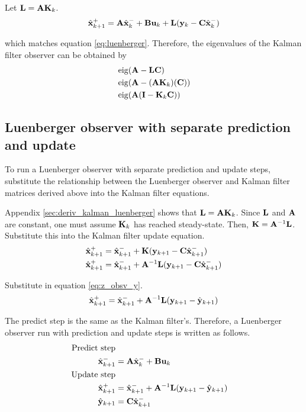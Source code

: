 Let $\mathbf{L} = \mathbf{A} \mathbf{K}_k$.
\begin{equation}
  \hat{\mathbf{x}}_{k+1}^+ = \mathbf{A}\hat{\mathbf{x}}_k^- + \mathbf{B}\mathbf{u}_k + \mathbf{L}
    (\mathbf{y}_k - \mathbf{C}\hat{\mathbf{x}}_k^-)
\end{equation}

which matches equation \eqref{eq:luenberger}. Therefore, the eigenvalues of the
Kalman filter \gls{observer} can be obtained by
\begin{align}
  &\operatorname{eig}(\mathbf{A} - \mathbf{L}\mathbf{C}) \nonumber \\
  &\operatorname{eig}(\mathbf{A} - (\mathbf{A}\mathbf{K}_k)(\mathbf{C})) \nonumber \\
  &\operatorname{eig}(\mathbf{A}(\mathbf{I} - \mathbf{K}_k\mathbf{C}))
\end{align}

\subsection{Luenberger observer with separate prediction and update}
\label{subsec:deriv_luenberger_separate}

To run a Luenberger \gls{observer} with separate prediction and update steps,
substitute the relationship between the Luenberger \gls{observer} and Kalman
filter matrices derived above into the Kalman filter equations.

Appendix \ref{sec:deriv_kalman_luenberger} shows that
$\mathbf{L} = \mathbf{A}\mathbf{K}_k$. Since $\mathbf{L}$ and $\mathbf{A}$ are constant, one
must assume $\mathbf{K}_k$ has reached steady-state. Then,
$\mathbf{K} = \mathbf{A}^{-1}\mathbf{L}$. Substitute this into the Kalman filter update
equation.
\begin{align*}
  \hat{\mathbf{x}}_{k+1}^+ &= \hat{\mathbf{x}}_{k+1}^- + \mathbf{K}(\mathbf{y}_{k+1} -
    \mathbf{C}\hat{\mathbf{x}}_{k+1}^-) \\
  \hat{\mathbf{x}}_{k+1}^+ &= \hat{\mathbf{x}}_{k+1}^- + \mathbf{A}^{-1}\mathbf{L}
    (\mathbf{y}_{k+1} - \mathbf{C}\hat{\mathbf{x}}_{k+1}^-)
\end{align*}

Substitute in equation \eqref{eq:z_obsv_y}.
\begin{equation*}
  \hat{\mathbf{x}}_{k+1}^+ = \hat{\mathbf{x}}_{k+1}^- + \mathbf{A}^{-1}\mathbf{L}
    (\mathbf{y}_{k+1} - \hat{\mathbf{y}}_{k+1})
\end{equation*}

The predict step is the same as the Kalman filter's. Therefore, a Luenberger
\gls{observer} run with prediction and update steps is written as follows.
\begin{align}
  \text{Predict step} \nonumber \\
  \hat{\mathbf{x}}_{k+1}^- &= \mathbf{A}\hat{\mathbf{x}}_k^- + \mathbf{B}\mathbf{u}_k \\
  \text{Update step} \nonumber \\
  \hat{\mathbf{x}}_{k+1}^+ &= \hat{\mathbf{x}}_{k+1}^- + \mathbf{A}^{-1}\mathbf{L}
    (\mathbf{y}_{k+1} - \hat{\mathbf{y}}_{k+1}) \\
  \hat{\mathbf{y}}_{k+1} &= \mathbf{C} \hat{\mathbf{x}}_{k+1}^-
\end{align}
